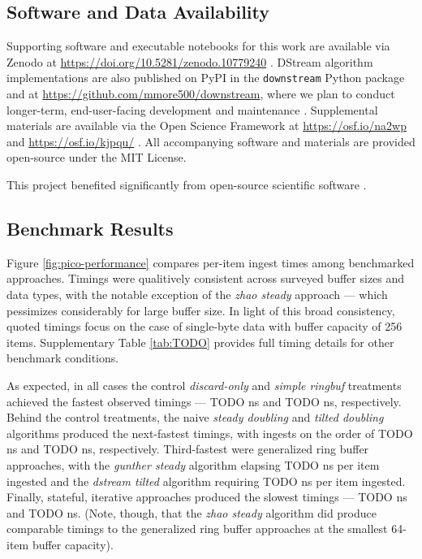\subsection{Software and Data Availability}
\label{sec:materials}

Supporting software and executable notebooks for this work are available via Zenodo at \url{https://doi.org/10.5281/zenodo.10779240} \citep{moreno2024hsurf}.
DStream algorithm implementations are also published on PyPI in the \texttt{downstream} Python package and at \url{https://github.com/mmore500/downstream}, where we plan to conduct longer-term, end-user-facing development and maintenance \citep{moreno2024downstream}.
Supplemental materials are available via the Open Science Framework at \url{https://osf.io/na2wp} and \url{https://osf.io/kjpqu/} \citep{foster2017open}.
All accompanying software and materials are provided open-source under the MIT License.

This project benefited significantly from open-source scientific software \citep{2020SciPy-NMeth,harris2020array,reback2020pandas,mckinney-proc-scipy-2010,waskom2021seaborn,hunter2007matplotlib,moreno2023teeplot}.

\subsection{Benchmark Results}



Figure \ref{fig:pico-performance} compares per-item ingest times among benchmarked approaches.
Timings were qualitively consistent across surveyed buffer sizes and data types, with the notable exception of the \textit{zhao steady} approach --- which pessimizes considerably for large buffer size.
In light of this broad consistency, quoted timings focus on the case of single-byte data with buffer capacity of 256 items.
Supplementary Table \ref{tab:TODO} provides full timing details for other benchmark conditions.

As expected, in all cases the control \textit{discard-only} and \textit{simple ringbuf} treatments achieved the fastest observed timings --- TODO ns and TODO ns, respectively.
Behind the control treatments, the naive \textit{steady doubling} and \textit{tilted doubling} algorithms produced the next-fastest timings, with ingests on the order of TODO ns and TODO ns, respectively.
Third-fastest were generalized ring buffer approaches, with the \textit{gunther steady} algorithm elapsing TODO ns per item ingested and the \textit{dstream tilted} algorithm requiring TODO ns per item ingested.
Finally, stateful, iterative approaches produced the slowest timings --- TODO ns and TODO ns.
(Note, though, that the \textit{zhao steady} algorithm did produce comparable timings to the generalized ring buffer approaches at the smallest 64-item buffer capacity).

